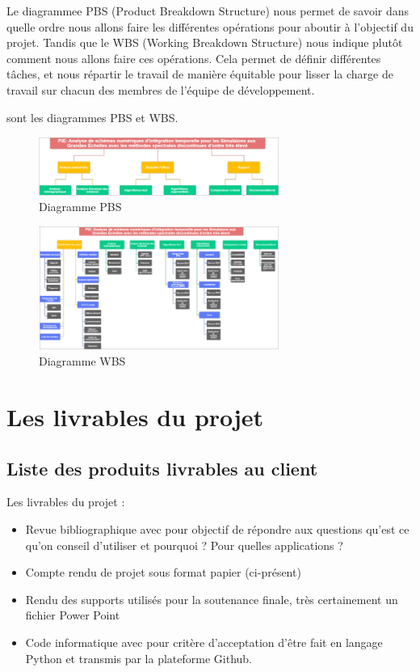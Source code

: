 \documentclass[a4paper,12pt]{report}
\theoremstyle{break}
\begin{document}
	Le diagrammee PBS (Product Breakdown Structure) nous permet de savoir dans quelle ordre nous allons faire les différentes opérations pour aboutir à l'objectif du projet. Tandis que le WBS (Working Breakdown Structure) nous indique plutôt comment nous allons faire ces opérations. Cela permet de définir différentes tâches, et nous répartir le travail de manière équitable pour lisser la charge de travail sur chacun des membres de l'équipe de développement. 
	
	 sont les diagrammes PBS et WBS. 

\begin{figure}
     \centering
      \includegraphics[width=0.7\textwidth]{images/PBS.png}
       \caption{Diagramme PBS}
    \label{chaine optim}
\end{figure}
    
  \begin{figure}
     \centering
       \includegraphics[width=0.7\textwidth]{images/WBS.png}
       \caption{Diagramme WBS}
     \label{chaine optim}
  \end{figure}
    
\chapter{Les livrables du projet}
\section{Liste des produits livrables au client}
   Les livrables du projet :
   \begin{itemize}[label=\textbullet]
   	\item Revue bibliographique avec pour objectif de répondre aux questions qu’est ce qu’on conseil d’utiliser et pourquoi ? Pour quelles applications ?
   	\item Compte rendu de projet sous format papier (ci-présent)
   	\item Rendu des supports utilisés pour la soutenance finale, très certainement un fichier Power Point
   	\item  Code informatique avec pour critère d’acceptation d’être fait en langage Python et transmis par la plateforme Github.
    \end{itemize}
\end{document}
